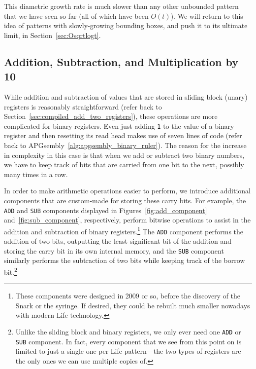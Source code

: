 
This diametric growth rate is much slower than any other unbounded pattern that we have seen so far (all of which have been $O(t)$). We will return to this idea of patterns with slowly-growing bounding boxes, and push it to its ultimate limit, in Section~\ref{sec:Osqrtlogt}.


\subsection{Addition, Subtraction, and Multiplication by 10}\label{sec:add_sub_and_mult10}

While addition and subtraction of values that are stored in sliding block (unary) registers is reasonably straightforward (refer back to Section~\ref{sec:compiled_add_two_registers}), these operations are more complicated for binary registers. Even just adding \texttt{1} to the value of a binary register and then resetting its read head makes use of seven lines of code (refer back to APGsembly~\ref{alg:apgsembly_binary_ruler}). The reason for the increase in complexity in this case is that when we add or subtract two binary numbers, we have to keep track of bits that are carried from one bit to the next, possibly many times in a row.

In order to make arithmetic operations easier to perform, we introduce additional components that are custom-made for storing these carry bits. For example, the \texttt{ADD} and \texttt{SUB} components displayed in Figures~\ref{fig:add_component} and~\ref{fig:sub_component}, respectively, perform bitwise operations to assist in the addition and subtraction of binary registers.\footnote{These components were designed in 2009 or so, before the discovery of the Snark or the syringe. If desired, they could be rebuilt much smaller nowadays with modern Life technology.} The \texttt{ADD} component performs the addition of two bits, outputting the least significant bit of the addition and storing the carry bit in its own internal memory, and the \texttt{SUB} component similarly performs the subtraction of two bits while keeping track of the borrow bit.\footnote{Unlike the sliding block and binary registers, we only ever need one \texttt{ADD} or \texttt{SUB} component. In fact, every component that we see from this point on is limited to just a single one per Life pattern---the two types of registers are the only ones we can use multiple copies of.}

